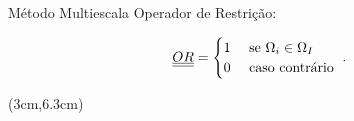 \documentclass[professionalfont]{beamer}
\begin{document}


\begin{frame}{Método Multiescala}
    \justify
    Operador de Restrição:

    \begin{equation}
        \label{eq:multiescala.11}
        \underline{\underline{OR}} = 
        \begin{cases}
            1 & \text{ se } \Omega_{i} \in \Omega_{I}\\
            0 & \text{ caso contrário }
        \end{cases}.
    \end{equation}

    
    
    \begin{textblock*}{5cm}(3cm,6.3cm) %
        
    \end{textblock*}

\end{frame}
\end{document}
